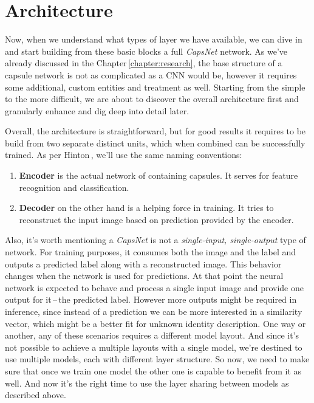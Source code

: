 \section{Architecture}

Now, when we understand what types of layer we have available, we can dive in and start building from these basic blocks a full \textit{CapsNet} network. As we've already discussed in the Chapter\,\ref{chapter:research}, the base structure of a capsule network is not as complicated as a CNN would be, however it requires some additional, custom entities and treatment as well. Starting from the simple to the more difficult, we are about to discover the overall architecture first and granularly enhance and dig deep into detail later.

Overall, the architecture is straightforward, but for good results it requires to be build from two separate distinct units, which when combined can be successfully trained. As per Hinton\,\cite{capsule}, we'll use the same naming conventions:

\begin{enumerate}
    \item \textbf{Encoder} is the actual network of containing capsules. It serves for feature recognition and classification.
    \item \textbf{Decoder} on the other hand is a helping force in training. It tries to reconstruct the input image based on prediction provided by the encoder.
\end{enumerate}

Also, it's worth mentioning a \textit{CapsNet} is not a \textit{single-input, single-output} type of network. For training purposes, it consumes both the image and the label and outputs a predicted label along with a reconstructed image. This behavior changes when the network is used for predictions. At that point the neural network is expected to behave and process a single input image and provide one output for it\,--\,the predicted label. However more outputs might be required in inference, since instead of a prediction we can be more interested in a similarity vector, which might be a better fit for unknown identity description. One way or another, any of these scenarios requires a different model layout. And since it's not possible to achieve a multiple layouts with a single model, we're destined to use multiple models, each with different layer structure. So now, we need to make sure that once we train one model the other one is capable to benefit from it as well. And now it's the right time to use the layer sharing between models as described above.

